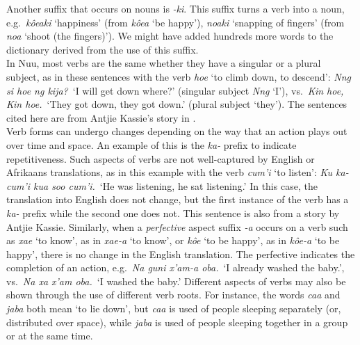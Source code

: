 Another suffix that occurs on nouns is \emph{-ki}. This suffix turns a
verb into a noun, e.g.\ \emph{k\^{o}eaki} `happiness' (from
\emph{k\^{o}ea} `be happy'), \emph{n\textipa{\textdoublebarpipe}oaki}
`snapping of fingers' (from \emph{n\textipa{\textdoublebarpipe}oa}
`shoot (the fingers)'). We might have added hundreds more words to the
dictionary derived from the use of this suffix.\\

In N\textipa{\textvertline}uu, most verbs are the same whether they
have a singular or a plural subject, as in these sentences with the
verb \emph{\textipa{\textdoublevertline}hoe} `to climb down, to
descend': \emph{N\textipa{\textvertline}ng si
\textipa{\textdoublevertline}hoe ng kija?}\ `I will get down where?'
(singular subject \emph{N\textipa{\textvertline}ng} `I'), vs.\
\emph{Kin \textipa{\textdoublevertline}hoe, Kin
\textipa{\textdoublevertline}hoe.}\ `They got down, they got down.'
(plural subject `they'). The sentences cited here are from Antjie
Kassie's story in \textcite{Collins2011}.\\

Verb forms can undergo changes depending on the way that an action
plays out over time and space. An example of this is the \emph{ka-}
prefix to indicate repetitiveness. Such aspects of verbs are not
well-captured by English or Afrikaans translations, as in this example
with the verb \emph{cum'i} `to listen': \emph{Ku ka-cum'i kua soo
cum'i.}\ `He was listening, he sat listening.' In this case, the
translation into English does not change, but the first instance of
the verb has a \emph{ka-} prefix while the second one does not. This
sentence is also from a story by Antjie Kassie. Similarly, when a
\emph{perfective} aspect suffix \emph{-a} occurs on a verb such as
\emph{\textipa{\textdoublevertline}xae} `to know', as in
\emph{\textipa{\textdoublevertline}xae-a} `to know', or \emph{k\^{o}e}
`to be happy', as in \emph{k\^{o}e-a} `to be happy', there is no
change in the English translation. The perfective indicates the
completion of an action, e.g.\ \emph{Na g\textipa{\textvertline}uni
\textipa{\textdoublevertline}x'am-a \textipa{\textvertline}oba.}\ `I
already washed the baby.', vs.\ \emph{Na xa
\textipa{\textdoublevertline}x'am \textipa{\textvertline}oba.}\ `I
washed the baby.' Different aspects of verbs may also be shown through
the use of different verb roots. For instance, the words \emph{caa}
and \emph{jaba} both mean `to lie down', but \emph{caa} is used of
people sleeping separately (or, distributed over space), while
\emph{jaba} is used of people sleeping together in a group or at the
same time.\\

